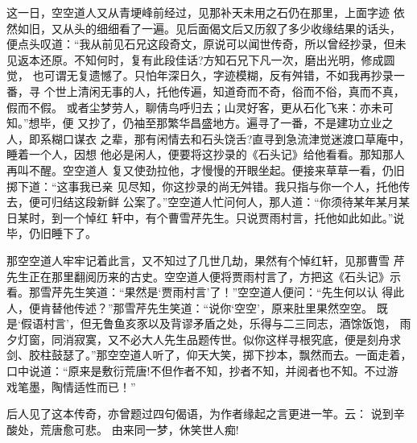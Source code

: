 这一日，空空道人又从青埂峰前经过，见那补天未用之石仍在那里，上面字迹
依然如旧，又从头的细细看了一遍。见后面偈文后又历叙了多少收缘结果的话头，
便点头叹道：“我从前见石兄这段奇文，原说可以闻世传奇，所以曾经抄录，但未
见返本还原。不知何时，复有此段佳话?方知石兄下凡一次，磨出光明，修成圆觉，
也可谓无复遗憾了。只怕年深日久，字迹模糊，反有舛错，不如我再抄录一番，寻
个世上清闲无事的人，托他传遍，知道奇而不奇，俗而不俗，真而不真，假而不假。
或者尘梦劳人，聊倩鸟呼归去；山灵好客，更从石化飞来：亦未可知。”想毕，便
又抄了，仍袖至那繁华昌盛地方。遍寻了一番，不是建功立业之人，即系糊口谋衣
之辈，那有闲情去和石头饶舌?直寻到急流津觉迷渡口草庵中，睡着一个人，因想
他必是闲人，便要将这抄录的《石头记》给他看看。那知那人再叫不醒。空空道人
复又使劲拉他，才慢慢的开眼坐起。便接来草草一看，仍旧掷下道：“这事我已亲
见尽知，你这抄录的尚无舛错。我只指与你一个人，托他传去，便可归结这段新鲜
公案了。”空空道人忙问何人，那人道：“你须待某年某月某日某时，到一个悼红
轩中，有个曹雪芹先生。只说贾雨村言，托他如此如此。”说毕，仍旧睡下了。

那空空道人牢牢记着此言，又不知过了几世几劫，果然有个悼红轩，见那曹雪
芹先生正在那里翻阅历来的古史。空空道人便将贾雨村言了，方把这《石头记》示
看。那雪芹先生笑道：“果然是‘贾雨村言’了！”空空道人便问：“先生何以认
得此人，便肯替他传述？”那雪芹先生笑道：“说你‘空空’，原来肚里果然空空。
既是‘假语村言’，但无鲁鱼亥豕以及背谬矛盾之处，乐得与二三同志，酒馀饭饱，
雨夕灯窗，同消寂寞，又不必大人先生品题传世。似你这样寻根究底，便是刻舟求
剑、胶柱鼓瑟了。”那空空道人听了，仰天大笑，掷下抄本，飘然而去。一面走着，
口中说道：“原来是敷衍荒唐!不但作者不知，抄者不知，并阅者也不知。不过游
戏笔墨，陶情适性而已！”

后人见了这本传奇，亦曾题过四句偈语，为作者缘起之言更进一竿。云：
说到辛酸处，荒唐愈可悲。
由来同一梦，休笑世人痴!